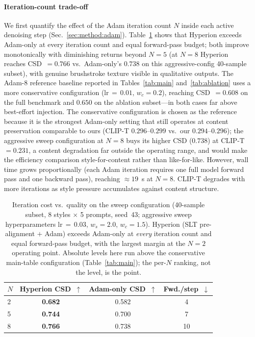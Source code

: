 \paragraph{Iteration-count trade-off}
We first quantify the effect of the Adam iteration count $N$ inside each
active denoising step (Sec.~\ref{sec:method:adam}).
Table~\ref{tab:iter_tradeoff} shows that Hyperion exceeds Adam-only at every
iteration count and equal forward-pass budget; both improve monotonically with
diminishing returns beyond $N=5$ (at $N=8$ Hyperion reaches CSD~$= 0.766$ vs.\
Adam-only's $0.738$ on this aggressive-config 40-sample subset), with genuine
brushstroke texture visible in qualitative outputs.
The Adam-8 reference baseline reported in Tables~\ref{tab:main}
and~\ref{tab:ablation} uses a more conservative configuration
(lr$\,{=}\,0.01$, $w_c{=}0.2$), reaching CSD~$= 0.608$ on the full benchmark
and $0.650$ on the ablation subset---in both cases far above best-effort
injection.
The conservative configuration is chosen as the reference because it is
the strongest Adam-only setting that still operates at content preservation
comparable to ours (CLIP-T $0.296$--$0.299$ vs.\ our $0.294$--$0.296$); the
aggressive sweep configuration at $N{=}8$ buys its higher CSD ($0.738$) at
CLIP-T~$=0.231$, a content degradation far outside the operating range, and
would make the efficiency comparison style-for-content rather than
like-for-like.
However, wall time grows proportionally (each Adam iteration requires one full
model forward pass and one backward pass), reaching $\approx 19$~s at $N=8$.
CLIP-T degrades with more iterations as style pressure accumulates
against content structure.

\begin{table}[h]
  \centering
  \caption{Iteration cost vs.\ quality on the sweep configuration (40-sample
           subset, 8 styles $\times$ 5 prompts, seed~43; aggressive sweep
           hyperparameters lr$\,{=}\,0.03$, $w_s{=}2.0$, $w_c{=}1.5$).
           Hyperion (SLT pre-alignment $+$ Adam) exceeds Adam-only at
           \emph{every} iteration count and equal forward-pass budget, with the
           largest margin at the $N{=}2$ operating point.
           Absolute levels here run above the conservative main-table
           configuration (Table~\ref{tab:main}); the per-$N$ ranking, not the
           level, is the point.}
  \label{tab:iter_tradeoff}
  \footnotesize
  \begin{tabular}{lccc}
    \toprule
    $N$ & Hyperion CSD~$\uparrow$ & Adam-only CSD~$\uparrow$ & Fwd./step~$\downarrow$ \\
    \midrule
    2   & \textbf{0.682} & 0.582 & 4  \\
    5   & \textbf{0.744} & 0.700 & 7  \\
    8   & \textbf{0.766} & 0.738 & 10 \\
    \bottomrule
  \end{tabular}
\end{table}

